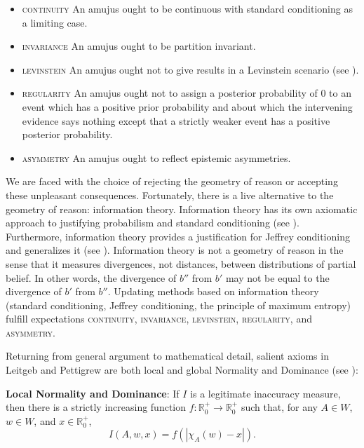 \documentclass[11pt]{article}
\begin{document}
\begin{itemize}
\item \textsc{continuity} An amujus ought to be continuous with
  standard conditioning as a limiting case.
\item \textsc{invariance} An amujus ought to be partition invariant.
\item \textsc{levinstein} An amujus ought not to give  results in a Levinstein scenario (see
  ).
\item \textsc{regularity} An amujus ought not to assign a posterior
  probability of $0$ to an event which has a positive prior
  probability and about which the intervening evidence says nothing
  except that a strictly weaker event has a positive posterior
  probability.
\item \textsc{asymmetry} An amujus ought to reflect epistemic
  asymmetries.
\end{itemize}

We are faced with the choice of rejecting the geometry of reason or
accepting these unpleasant consequences. Fortunately, there is a live
alternative to the geometry of reason: information theory. Information
theory has its own axiomatic approach to justifying probabilism and
standard conditioning (see ). Furthermore,
information theory provides a justification for Jeffrey conditioning
and generalizes it (see ). Information theory is
not a geometry of reason in the sense that it measures divergences,
not distances, between distributions of partial belief. In other
words, the divergence of $b''$ from $b'$ may not be equal to the
divergence of $b'$ from $b''$. Updating methods based on information
theory (standard conditioning, Jeffrey conditioning, the principle of
maximum entropy) fulfill expectations \textsc{continuity},
\textsc{invariance}, \textsc{levinstein}, \textsc{regularity}, and
\textsc{asymmetry}.

Returning from general argument to mathematical detail, salient axioms
in Leitgeb and Pettigrew are both local and global Normality and
Dominance (see ):

\begin{quotex}
  \textbf{Local Normality and Dominance}: If $I$ is a legitimate
  inaccuracy measure, then there is a strictly increasing function
  $f:\mathbb{R}^{+}_{0}\rightarrow\mathbb{R}^{+}_{0}$ such that, for
  any $A\in{}W$, $w\in{}W$, and $x\in\mathbb{R}^{+}_{0}$,
  \begin{equation}
    \label{eq:e4}
    I(A,w,x)=f\left(|\chi_{A}(w)-x|\right).
  \end{equation}
\end{quotex}
\end{document}
